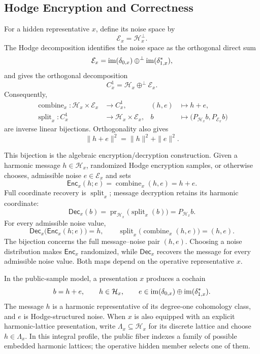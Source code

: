 \subsection{Hodge Encryption and Correctness}

For a hidden representative \(x\), define its noise space by
\[
  \mathcal E_x=\mathcal H_x^\perp.
\]
The Hodge decomposition identifies the noise space as the orthogonal direct
sum
\[
  \mathcal E_x
  =
  \operatorname{im}(\delta_{0,x})
  \oplus^\perp
  \operatorname{im}(\delta_{1,x}^{\ast}),
\]
and gives the orthogonal decomposition
\[
  C_x^1=\mathcal H_x\oplus^\perp\mathcal E_x.
\]
Consequently,
\[
\begin{aligned}
  \operatorname{combine}_x:
    \mathcal H_x\times\mathcal E_x&\longrightarrow C_x^1,
  &(h,e)&\longmapsto h+e,\\
  \operatorname{split}_x:C_x^1&\longrightarrow
    \mathcal H_x\times\mathcal E_x,
  &b&\longmapsto
    \bigl(P_{\mathcal H_x}b,P_{\mathcal E_x}b\bigr)
\end{aligned}
\]
are inverse linear bijections. Orthogonality also gives
\[
  \|h+e\|^2=\|h\|^2+\|e\|^2.
\]

This bijection is the algebraic encryption/decryption construction. Given a
harmonic message \(h\in\mathcal H_x\), randomized Hodge encryption samples, or
otherwise chooses, admissible noise \(e\in\mathcal E_x\) and sets
\[
  \mathsf{Enc}_x(h;e)=
  \operatorname{combine}_x(h,e)=h+e.
\]
Full coordinate recovery is \(\operatorname{split}_x\); message decryption
retains its harmonic coordinate:
\[
  \mathsf{Dec}_x(b)
  =
  \operatorname{pr}_{\mathcal H_x}
    \bigl(\operatorname{split}_x(b)\bigr)
  =
  P_{\mathcal H_x}b.
\]
For every admissible noise value,
\[
  \mathsf{Dec}_x\bigl(\mathsf{Enc}_x(h;e)\bigr)=h,
  \qquad
  \operatorname{split}_x\bigl(\operatorname{combine}_x(h,e)\bigr)=(h,e).
\]
The bijection concerns the full message--noise pair \((h,e)\). Choosing a
noise distribution makes \(\mathsf{Enc}_x\) randomized, while
\(\mathsf{Dec}_x\) recovers the message for every admissible noise value.
Both maps depend on the operative representative \(x\).

In the \HE{} public-sample model, a presentation \(x\) produces a cochain
\[
  b=h+e,
  \qquad
  h\in\mathcal H_x,
  \qquad
  e\in\operatorname{im}(\delta_{0,x})\oplus\operatorname{im}(\delta_{1,x}^\ast).
\]
The message \(h\) is a harmonic representative of its degree-one cohomology
class, and \(e\) is Hodge-structured noise. When \(x\) is also equipped with
an explicit harmonic-lattice presentation, write
\(\Lambda_x\subseteq\mathcal H_x\) for its discrete lattice and choose
\(h\in\Lambda_x\). In this integral profile, the public fiber indexes a
family of possible embedded harmonic lattices; the operative hidden member
selects one of them.
